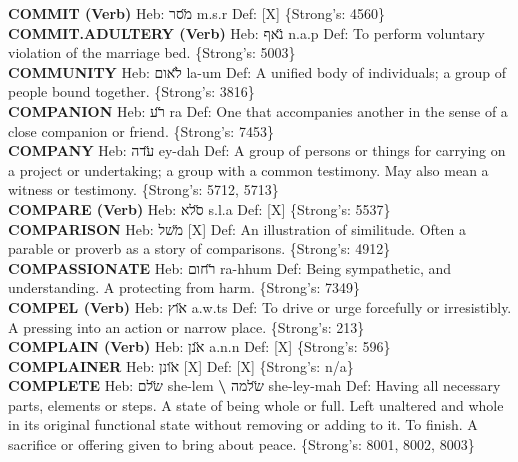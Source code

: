 {\textbf{COMMIT (Verb)} Heb: {\large\H מסר} m.s.r Def: {[}X{]} \{Strong's: 4560\}\hfill{}\\

\textbf{COMMIT.ADULTERY (Verb)} Heb: {\large\H נאף} n.a.p Def: To perform voluntary violation of the marriage bed. \{Strong's: 5003\}\hfill{}\\

\textbf{COMMUNITY} Heb: {\large\H לאום} la-um Def: A unified body of individuals; a group of people bound together. \{Strong's: 3816\}\hfill{}\\

\textbf{COMPANION} Heb: {\large\H רע} ra Def: One that accompanies another in the sense of a close companion or friend. \{Strong's: 7453\}\hfill{}\\

\textbf{COMPANY} Heb: {\large\H עדה} ey-dah Def: A group of persons or things for carrying on a project or undertaking; a group with a common testimony. May also mean a witness or testimony. \{Strong's: 5712, 5713\}\hfill{}\\

\textbf{COMPARE (Verb)} Heb: {\large\H סלא} s.l.a Def: {[}X{]} \{Strong's: 5537\}\hfill{}\\

\textbf{COMPARISON} Heb: {\large\H משל} {[}X{]} Def: An illustration of similitude. Often a parable or proverb as a story of comparisons. \{Strong's: 4912\}\hfill{}\\

\textbf{COMPASSIONATE} Heb: {\large\H רחום} ra-hhum Def: Being sympathetic, and understanding. A protecting from harm. \{Strong's: 7349\}\hfill{}\\

\textbf{COMPEL (Verb)} Heb: {\large\H אוץ} a.w.ts Def: To drive or urge forcefully or irresistibly. A pressing into an action or narrow place. \{Strong's: 213\}\hfill{}\\

\textbf{COMPLAIN (Verb)} Heb: {\large\H אנן} a.n.n Def: {[}X{]} \{Strong's: 596\}\hfill{}\\

\textbf{COMPLAINER} Heb: {\large\H אונן} {[}X{]} Def: {[}X{]} \{Strong's: n/a\}\hfill{}\\

\textbf{COMPLETE} Heb: {\large\H שלם} she-lem \textbf{\textbackslash{}} {\large\H שלמה} she-ley-mah Def: Having all necessary parts, elements or steps. A state of being whole or full. Left unaltered and whole in its original functional state without removing or adding to it. To finish. A sacrifice or offering given to bring about peace. \{Strong's: 8001, 8002, 8003\}\hfill{}\\

}
